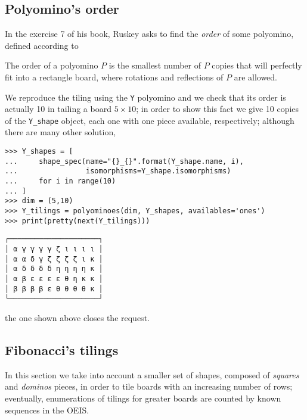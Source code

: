 \subsection{Polyomino's order}

In the exercise 7 of his book, Ruskey asks to find the \textit{order} of some
polyomino, defined according to

\begin{definition}
The order of a polyomino $P$ is the smallest number of $P$ copies that will
perfectly fit into a rectangle board, where rotations and reflections of $P$
are allowed.
\end{definition}

We reproduce the tiling using the \verb|Y| polyomino and we check that its
order is actually 10 in tailing a board $5\times 10$; in order to show this
fact we give 10 copies of the \verb|Y_shape| object, each one with one piece
available, respectively; although there are many other solution,
\begin{verbatim}
>>> Y_shapes = [
...     shape_spec(name="{}_{}".format(Y_shape.name, i),
...                isomorphisms=Y_shape.isomorphisms)
...     for i in range(10)
... ]
>>> dim = (5,10)
>>> Y_tilings = polyominoes(dim, Y_shapes, availables='ones')
>>> print(pretty(next(Y_tilings)))
\end{verbatim}
\begin{Verbatim}[baselinestretch=0.1, fontsize=\small]
┌─────────────────────┐
│ α γ γ γ γ ζ ι ι ι ι │
│ α α δ γ ζ ζ ζ ζ ι κ │
│ α δ δ δ δ η η η η κ │
│ α β ε ε ε ε θ η κ κ │
│ β β β β ε θ θ θ θ κ │
└─────────────────────┘
\end{Verbatim}
the one shown above closes the request.
\vfill

\subsection{Fibonacci's tilings}

In this section we take into account a smaller set of shapes, composed of
\textit{squares} and \textit{dominos} pieces, in order to tile boards with an
increasing number of rows; eventually, enumerations of tilings for greater
boards are counted by known sequences in the OEIS.


